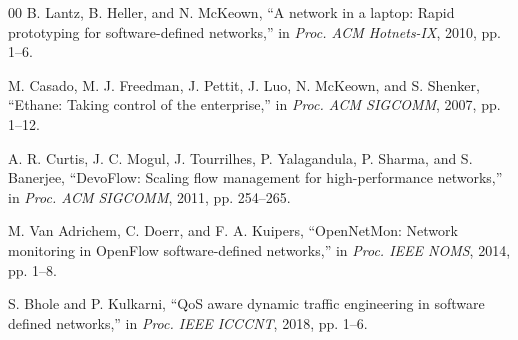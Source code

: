 \documentclass[conference]{IEEEtran}
\begin{document}
\begin{thebibliography}{00}
 B. Lantz, B. Heller, and N. McKeown, ``A network in a laptop: Rapid prototyping for software-defined networks,'' in \textit{Proc. ACM Hotnets-IX}, 2010, pp. 1--6.

 M. Casado, M. J. Freedman, J. Pettit, J. Luo, N. McKeown, and S. Shenker, ``Ethane: Taking control of the enterprise,'' in \textit{Proc. ACM SIGCOMM}, 2007, pp. 1--12.

 A. R. Curtis, J. C. Mogul, J. Tourrilhes, P. Yalagandula, P. Sharma, and S. Banerjee, ``DevoFlow: Scaling flow management for high-performance networks,'' in \textit{Proc. ACM SIGCOMM}, 2011, pp. 254--265.

 M. Van Adrichem, C. Doerr, and F. A. Kuipers, ``OpenNetMon: Network monitoring in OpenFlow software-defined networks,'' in \textit{Proc. IEEE NOMS}, 2014, pp. 1--8.

 S. Bhole and P. Kulkarni, ``QoS aware dynamic traffic engineering in software defined networks,'' in \textit{Proc. IEEE ICCCNT}, 2018, pp. 1--6.
\end{thebibliography}
\end{document}
